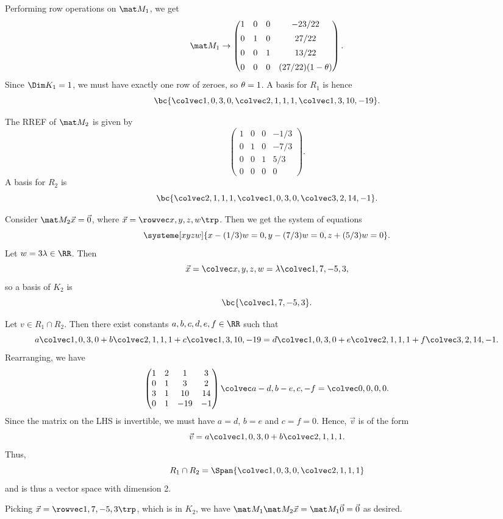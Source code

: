 \begin{solution}
    \begin{ppart}
        Performing row operations on $\mat M_1$, we get \[\mat M_1 \rightarrow \begin{pmatrix}1 & 0 & 0 & -23/22 \\[0.5em] 0 & 1 & 0 & 27/22 \\[0.5em] 0 & 0 & 1 & 13/22 \\[0.5em] 0 & 0 & 0 & (27/22)(1 - \t) \end{pmatrix}.\] Since $\Dim K_1 = 1$, we must have exactly one row of zeroes, so $\theta = 1$. A basis for $R_1$ is hence \[\bc{\cveciv1030, \cveciv2111, \cveciv13{10}{-19}}.\]
    \end{ppart}
    \begin{ppart}
        The RREF of $\mat M_2$ is given by \[\begin{pmatrix}1 & 0 & 0 & -1/3 \\[0.5em] 0 & 1 & 0 & -7/3 \\[0.5em] 0 & 0 & 1 & 5/3 \\[0.5em] 0 & 0 & 0 & 0\end{pmatrix}.\] A basis for $R_2$ is \[\bc{\cveciv2111, \cveciv1030, \cveciv32{14}{-1}}.\]

        Consider $\mat M_2 \vec x = \vec 0$, where $\vec x = \cvecivx{x}{y}{z}{w}$. Then we get the system of equations \[\systeme[xyzw]{x - (1/3) w = 0, y - (7/3) w = 0, z + (5/3) w = 0}.\] Let $w = 3\l \in \RR$. Then \[\vec x = \cveciv{x}{y}{z}{w} = \l \cveciv17{-5}3,\] so a basis of $K_2$ is \[\bc{\cveciv17{-5}3}.\]
    \end{ppart}
    \begin{ppart}
        Let $v \in R_1 \cap R_2$. Then there exist constants $a, b, c, d, e, f \in \RR$ such that \[a \cveciv1030 + b \cveciv2111 + c\cveciv13{10}{-19} = d \cveciv1030 + e\cveciv2111 + f\cveciv32{14}{-1}.\] Rearranging, we have \[\begin{pmatrix}1 & 2 & 1 & 3 \\ 0 & 1 & 3 & 2 \\ 3 & 1 & 10 & 14 \\ 0 & 1 & -19 &-1\end{pmatrix} \cveciv{a-d}{b-e}{c}{-f} = \cveciv0000.\] Since the matrix on the LHS is invertible, we must have $a = d$, $b = e$ and $c = f = 0$. Hence, $\vec v$ is of the form \[\vec v = a \cveciv1030 + b \cveciv2111.\] Thus, \[R_1 \cap R_2 = \Span{\cveciv1030, \cveciv2111}\] and is thus a vector space with dimension 2.
    \end{ppart}
    \begin{ppart}
        Picking $\vec x = \cvecivx17{-5}3$, which is in $K_2$, we have $\mat M_1 \mat M_2 \vec x = \mat M_1 \vec 0 = \vec 0$ as desired.
    \end{ppart}
\end{solution}

